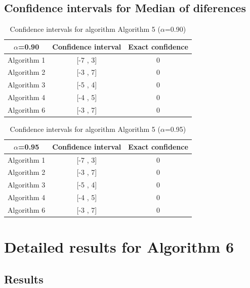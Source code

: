 \documentclass[a4paper,10pt]{article}
\begin{document}
\subsection{Confidence intervals for Median of diferences}

\begin{table}[!htp]
\centering\small
\begin{tabular}{
|c|c|c|}
\hline
 $\alpha$=0.90 & Confidence interval & Exact confidence \\ \hline 
Algorithm 1 & [-7 , 3] & 0\\ \hline 
Algorithm 2 & [-3 , 7] & 0\\ \hline 
Algorithm 3 & [-5 , 4] & 0\\ \hline 
Algorithm 4 & [-4 , 5] & 0\\ \hline 
Algorithm 6 & [-3 , 7] & 0\\ \hline 

\end{tabular}
\caption{Confidence intervals for algorithm Algorithm 5 ($\alpha$=0.90)}
\end{table}
\begin{table}[!htp]
\centering\small
\begin{tabular}{
|c|c|c|}
\hline
 $\alpha$=0.95 & Confidence interval & Exact confidence \\ \hline 
Algorithm 1 & [-7 , 3] & 0\\ \hline 
Algorithm 2 & [-3 , 7] & 0\\ \hline 
Algorithm 3 & [-5 , 4] & 0\\ \hline 
Algorithm 4 & [-4 , 5] & 0\\ \hline 
Algorithm 6 & [-3 , 7] & 0\\ \hline 

\end{tabular}
\caption{Confidence intervals for algorithm Algorithm 5 ($\alpha$=0.95)}
\end{table}

 \clearpage 


\section{Detailed results for Algorithm 6}


\subsection{Results}
\end{document}
